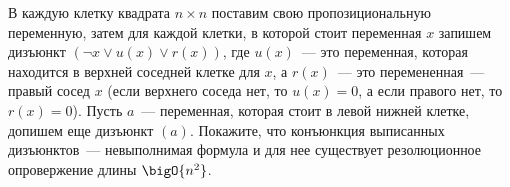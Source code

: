 В каждую клетку квадрата $n \times n$ поставим свою пропозициональную переменную, затем для каждой
клетки, в которой стоит переменная $x$ запишем дизъюнкт $(\lnot x \lor u(x) \lor r(x))$, где $u(x)$~---
это переменная, которая находится в верхней соседней клетке для $x$, а $r(x)$~--- это перемененная~---
правый сосед $x$ (если верхнего соседа нет, то $u(x) = 0$, а если правого нет, то $r(x) = 0$). Пусть
$a$~--- переменная, которая стоит в левой нижней клетке, допишем еще дизъюнкт $(a)$. Покажите, что
конъюнкция выписанных дизъюнктов~--- невыполнимая формула и для нее существует резолюционное опровержение
длины $\bigO{n^2}$.
